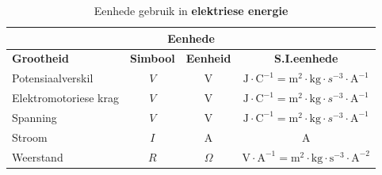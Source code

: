 \begin{table}[H]
\begin{center}
\begin{tabular}{|l|c|c|c|}\hline \hline 
\multicolumn{4}{|c|}{\textbf{Eenhede}}\\ \hline \hline
\textbf{Grootheid} & \textbf{Simbool} & \textbf{Eenheid} &
\textbf{S.I.eenhede}\\ \hline
Potensiaalverskil & $V$ & V &
$\text{J}\cdot\text{C}^{-1}=\text{m}^2\cdot\text{kg}\cdot{s}^{-3}\cdot\text{A}^{
-1}$ \\ \hline
Elektromotoriese krag & $V$ & V &
$\text{J}\cdot\text{C}^{-1}=\text{m}^2\cdot\text{kg}\cdot{s}^{-3}\cdot\text{A}^{
-1}$ \\ \hline
Spanning & $V$ & V &
$\text{J}\cdot\text{C}^{-1}=\text{m}^2\cdot\text{kg}\cdot{s}^{-3}\cdot\text{A}^{
-1}$ \\ \hline
Stroom & $I$ & A & A \\ \hline
Weerstand & $R$ & $\Omega$ & $\text{V}\cdot\text{A}^{-1} =
\text{m}^2\cdot\text{kg}\cdot\text{s}^{-3}\cdot\text{A}^{-2}$ \\ \hline
\end{tabular}
\end{center}
\caption{Eenhede gebruik in \textbf{elektriese energie} }
\label{table:electricity::units}
\end{table}


